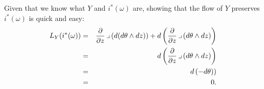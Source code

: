 \documentclass[10pt]{article}
\numberwithin{equation}{subsection}
\begin{document}
Given that we know what $Y$ and $i^*(\omega)$ are, showing that the flow of $Y$
preserves $i^*(\omega)$ is quick and easy:
\begin{eqnarray*}
	L_Y(i^*(\omega)) &=& \frac{\partial}{\partial z} \,\lrcorner\, (d(d\theta\wedge dz)) + d\left(\frac{\partial}{\partial z}\,\lrcorner\,(d\theta\wedge dz)\right) \\
	&=& d\left(\frac{\partial}{\partial z} \,\lrcorner\,(d\theta\wedge dz)\right) \\
	&=& d\left(-d\theta)\right) \\
	&=& 0.
\end{eqnarray*}

\end{document}
